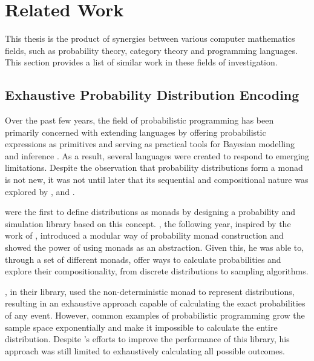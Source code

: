 \documentclass[
  oneside,
  11pt, a4paper,
  footinclude=true,
  headinclude=true,
  cleardoublepage=empty
]{scrbook}
\theoremstyle{definition}
\theoremstyle{definition}
\begin{document}
	\section{Related Work}\label{sec-related-work}
	    
    This thesis is the product of synergies between various computer mathematics fields, such as probability theory, category theory and programming languages. This section provides a list of similar work in these fields of investigation.

        \subsection{Exhaustive Probability Distribution Encoding}
        
    Over the past few years, the field of probabilistic programming has been primarily concerned with extending languages by offering probabilistic expressions as primitives and serving as practical tools for Bayesian modelling and inference \citep{erwig_kollmansberger_2006}. As a result, several languages were created to respond to emerging limitations. Despite the observation that probability distributions form a monad is not new, it was not until later that its sequential and compositional nature was explored by \cite{Ramsey:2002:SLC:565816.503288}, \cite{Goodman:2013:PPP:2480359.2429117} and \cite{Gordon:2013:MPB:2429069.2429119}.
        
        \cite{erwig_kollmansberger_2006} were the first to define distributions as monads by designing a probability and simulation library based on this concept. \cite{kidd2007build}, the following year, inspired by the work of \cite{Ramsey:2002:SLC:565816.503288}, introduced a modular way of probability monad construction and showed the power of using monads as an abstraction. Given this, he was able to, through a set of different monads, offer ways to calculate probabilities and explore their compositionality, from discrete distributions to sampling algorithms.
                
         \cite{erwig_kollmansberger_2006}, in their library, used the non-deterministic monad to represent distributions, resulting in an exhaustive approach capable of calculating the exact probabilities of any event. However, common examples of probabilistic programming grow the sample space exponentially and make it impossible to calculate the entire distribution. Despite \cite{larsen2011memory}'s efforts to improve the performance of this library, his approach was still limited to exhaustively calculating all possible outcomes.
                
\end{document}
